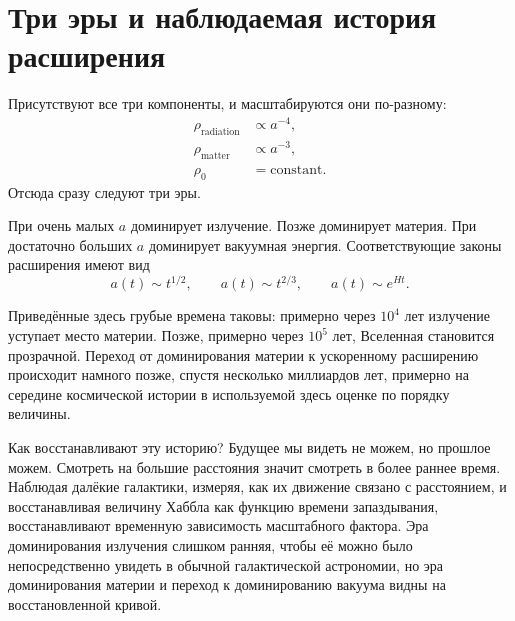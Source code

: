 \begin{classroomqa}
\end{classroomqa}

\section{Три эры и наблюдаемая история расширения}

Присутствуют все три компоненты, и масштабируются они по-разному:
\begin{equation}
\begin{aligned}
\rho_{\text{radiation}}&\propto a^{-4},\\
\rho_{\text{matter}}&\propto a^{-3},\\
\rho_0&=\text{constant}.
\end{aligned}
\end{equation}
Отсюда сразу следуют три эры.

При очень малых \(a\) доминирует излучение. Позже доминирует материя. При достаточно больших \(a\) доминирует вакуумная энергия. Соответствующие законы расширения имеют вид
\begin{equation}
a(t)\sim t^{1/2},
\qquad
a(t)\sim t^{2/3},
\qquad
a(t)\sim e^{Ht}.
\end{equation}

Приведённые здесь грубые времена таковы: примерно через \(10^4\) лет излучение уступает место материи. Позже, примерно через \(10^5\) лет, Вселенная становится прозрачной. Переход от доминирования материи к ускоренному расширению происходит намного позже, спустя несколько миллиардов лет, примерно на середине космической истории в используемой здесь оценке по порядку величины.

Как восстанавливают эту историю? Будущее мы видеть не можем, но прошлое можем. Смотреть на большие расстояния значит смотреть в более раннее время. Наблюдая далёкие галактики, измеряя, как их движение связано с расстоянием, и восстанавливая величину Хаббла как функцию времени запаздывания, восстанавливают временную зависимость масштабного фактора. Эра доминирования излучения слишком ранняя, чтобы её можно было непосредственно увидеть в обычной галактической астрономии, но эра доминирования материи и переход к доминированию вакуума видны на восстановленной кривой.

